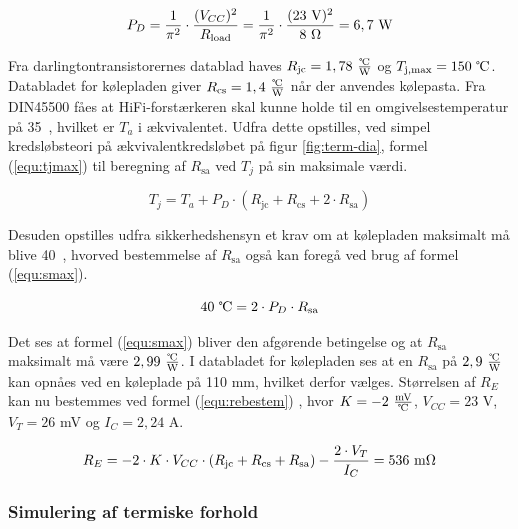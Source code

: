 \begin{equation}
\label{equ:pd}
P_D = \frac{1}{\pi^2} \cdot \frac{(V_{CC})^2}{R_{\mathrm{load}}} = \frac{1}{\pi^2} \cdot \frac{(23~\mathrm{V})^2}{8~\ohm} = 6,7~\mathrm{W}
\end{equation}

Fra darlingtontransistorernes datablad haves $R_{\mathrm{jc}} = 1,78~\tfrac{\celsius}{\mathrm{W}}$ og $T_{\mathrm{j,max}} = 150~\celsius$. Databladet for kølepladen giver $R_{\mathrm{cs}} = 1,4~\tfrac{\celsius}{\mathrm{W}}$ når der anvendes kølepasta. Fra DIN45500 \cite{DIN45500} fåes at HiFi-forstærkeren skal kunne holde til en omgivelsestemperatur på 35~\celsius, hvilket er $T_a$ i ækvivalentet. Udfra dette opstilles, ved simpel kredsløbsteori på ækvivalentkredsløbet på figur \ref{fig:term-dia}, formel (\ref{equ:tjmax}) til beregning af $R_{\mathrm{sa}}$ ved $T_j$  på sin maksimale værdi. 

\begin{equation}
\label{equ:tjmax}
T_j = T_a + P_D \cdot (R_{\mathrm{jc}} + R_{\mathrm{cs}} + 2 \cdot R_{\mathrm{sa}})
\end{equation}

Desuden opstilles udfra sikkerhedshensyn et krav om at kølepladen maksimalt må blive 40~\celsius, hvorved bestemmelse af $R_{\mathrm{sa}}$ også kan foregå ved brug af formel (\ref{equ:smax}). 

\begin{equation}
\label{equ:smax}
40~\celsius = 2 \cdot P_D \cdot R_{\mathrm{sa}}
\end{equation}

Det ses at formel (\ref{equ:smax}) bliver den afgørende betingelse og at $R_{\mathrm{sa}}$ maksimalt må være $2,99~\tfrac{\celsius}{\mathrm{W}}$. I databladet for kølepladen ses at en $R_{\mathrm{sa}}$ på $2,9~\tfrac{\celsius}{\mathrm{W}}$ kan opnåes ved en køleplade på 110 mm, hvilket derfor vælges. Størrelsen af $R_E$ kan nu bestemmes ved formel (\ref{equ:rebestem}) \cite{ael-mm19-ole-mod}%
, hvor $K = - 2~\tfrac{\mathrm{mV}}{\celsius}$, $V_{CC} = 23$ V, $V_T = 26$ mV og $I_C = 2,24$ A.

\begin{equation}
\label{equ:rebestem}
R_E = - 2 \cdot K \cdot V_{CC} \cdot (R_{\mathrm{jc}} + R_{\mathrm{cs}} + R_{\mathrm{sa}}) - \frac{2 \cdot V_T}{I_C} = 536~\mathrm{m}\ohm
\end{equation}

\subsubsection*{Simulering af termiske forhold}

